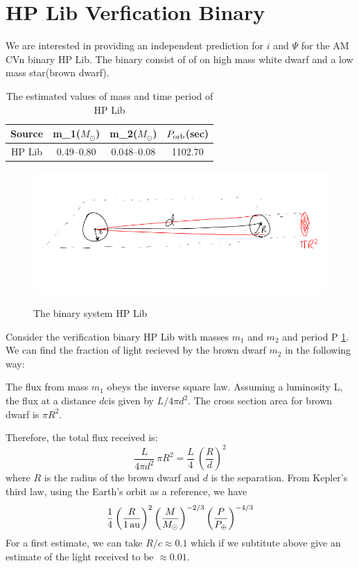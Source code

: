 \documentclass[10pt,a4paper]{article}
\begin{document}
\section*{HP Lib Verfication Binary}

We are interested in providing an independent prediction for $i$ and $\Psi$ for the AM CVn binary HP Lib. The binary consist of of on high mass white dwarf and a low mass star(brown dwarf).\\

\begin{table}[H]
\centering
\begin{tabular}{|c|c|c|c|}
\hline 
\rule[-1ex]{0pt}{2.5ex} Source & m_1($M_{\odot}$) & m_2($M_{\odot}$) & $P_{\rm orb}$(sec) \\ 
\hline 
\rule[-1ex]{0pt}{2.5ex} HP Lib & 0.49--0.80 & 0.048--0.08 & 1102.70 \\ 
\hline 
\end{tabular}
\caption{The estimated values of mass and time period of HP Lib}
\end{table}

\begin{figure}[ht]
\centering
\includegraphics[scale=0.5]{diagram1.png}
\label{1}
\caption{The binary system HP Lib}
\end{figure}

Consider the verification binary HP Lib with masses $m_1$ and $m_2$ and period P \ref{1}. We can find the fraction of light recieved by the brown dwarf $m_2$ in the following way:

The flux from mass $m_1$ obeys the inverse square law. Assuming a luminosity L, the flux at a distance $d$cis given by $L/4 \pi d^2$. The cross section area for brown dwarf is $\pi R^2$.

Therefore, the total flux received is:
\begin{equation}
\frac{L}{4 \pi d^2} \ \pi R^2 = \frac{L}{4} \ \left(\frac{R}{d}\right)^2
\end{equation}
where $R$ is the radius of the brown dwarf and $d$ is the separation.
From Kepler's third law, using the Earth's orbit as a reference, we have
\begin{equation}
  \frac{1}{4} \left(\frac{R}{\rm 1\,au}\right)^2
  \left(\frac{M}{M_{\odot}}\right)^{-2/3}
  \left(\frac{P}{P_{\oplus}}\right)^{-4/3}
\end{equation}
For a first estimate, we can take $R/c \approx 0.1$ which if we subtitute above give an estimate of the light received to be $\approx 0.01$.



\end{document}
